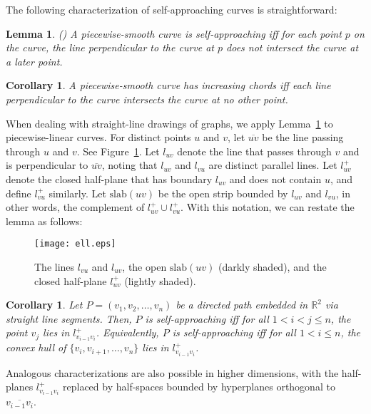 \documentclass[11pt]{article}
\newcommand{\perpslab}[1]{\mathrm{slab}(#1)}
\newtheorem{lemma}[theorem]{Lemma}
\newtheorem{corollary}[theorem]{Corollary}
\newcommand{\changed}[1]{#1}
\newcommand{\changeA}[1]{{#1}}
\begin{document}
The following characterization of self-approaching curves is straightforward:
\begin{lemma}(\cite{Icking:self-approachingcurves:1995})
\label{lem:perpendSA}
{\changed A piecewise-smooth curve is self-approaching iff for each point $p$ on the curve, the line perpendicular to the curve at $p$ does not intersect the curve at a later point.}
\end{lemma}



\begin{corollary}
\label{lem:perpendIC}
{\changed A piecewise-smooth curve has increasing chords iff each line perpendicular to the curve intersects the curve at no other point.}
\end{corollary}


When dealing with straight-line drawings of graphs, we apply Lemma~\ref{lem:perpendSA} to piecewise-linear curves.
\changeA{
For distinct points $u$ and $v$, let $\overline{uv}$ be the line passing through $u$ and $v$.
See Figure~\ref{fig:ell}.
Let $l_{uv}$ denote the line that passes through $v$ and is perpendicular to $\overline{uv}$, noting that $l_{uv}$ and $l_{vu}$ are distinct parallel lines.
Let $l_{uv}^+$ denote the closed half-plane that has boundary $l_{uv}$ and does not contain $u$, and define $l_{vu}^+$ similarly.
Let $\perpslab{uv}$ be the open strip bounded by $l_{uv}$ and $l_{vu}$, in other words,
the complement of $l_{uv}^+ \cup l_{vu}^+$.
With this notation, we can restate the lemma as follows:}


\begin{figure}[htb]
\centering
\texttt{[image: ell.eps]}
\caption{
\changeA{The lines $l_{vu}$ and $l_{uv}$, the open $\perpslab{uv}$ (darkly shaded), and the closed half-plane $l_{uv}^+$ (lightly shaded).}
}
\label{fig:ell}
\end{figure}

\begin{corollary}
\label{cor:edgeperpend}
Let $P=(v_1,v_2,\ldots,v_n)$ be a directed path embedded in $\mathbb{R}^2$ via straight line segments.  Then, $P$ is self-approaching iff for all $1 < i < j \leq n$, the point $v_j$ lies in $l_{v_{i-1}v_i}^+$.  Equivalently, $P$ is self-approaching iff for all $1 < i \leq n$, the convex hull of $\{v_i,v_{i+1},\ldots,v_n\}$ lies in $l_{v_{i-1}v_i}^+$.
\end{corollary}



Analogous characterizations are also possible in higher dimensions, with the half-planes $l_{v_{i-1}v_i}^+$ replaced by half-spaces bounded by hyperplanes orthogonal to $\overline{v_{i-1}v_i}$.
\end{document}
